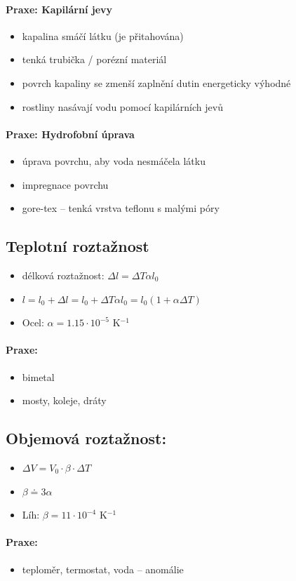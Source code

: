 \paragraph{Praxe: Kapilární jevy}
\begin{itemize}
\item kapalina smáčí látku (je přitahována)
\item tenká trubička / porézní materiál
\item povrch kapaliny se zmenší zaplnění dutin \ra energeticky výhodné
\item rostliny nasávají vodu pomocí kapilárních jevů
\end{itemize}

\paragraph{Praxe: Hydrofobní úprava}
\begin{itemize}
\item úprava povrchu, aby voda nesmáčela látku
\item impregnace povrchu
\item gore-tex -- tenká vrstva teflonu s malými póry
\end{itemize}

\subsection{Teplotní roztažnost}
\begin{itemize}
\item délková roztažnost: $\Delta l = \Delta T \alpha l_0$
\item $l = l_0 + \Delta l = l_0 + \Delta T \alpha l_0 = l_0(1+\alpha \Delta T)$
\item Ocel: $\alpha = 1.15 \cdot 10^{-5}$ K$^{-1}$
\end{itemize}

\paragraph{Praxe:}
\begin{itemize}
\item bimetal
\item mosty, koleje, dráty
\end{itemize}

\subsection{Objemová roztažnost:}
\begin{itemize}
\item $\Delta V = V_0 \cdot \beta \cdot \Delta T$
\item $\beta \doteq 3\alpha$
\item Líh: $\beta = 11\cdot 10^{-4}$ K$^{-1}$
\end{itemize}

\paragraph{Praxe:}
\begin{itemize}
\item teploměr, termostat, voda -- anomálie
\end{itemize}

